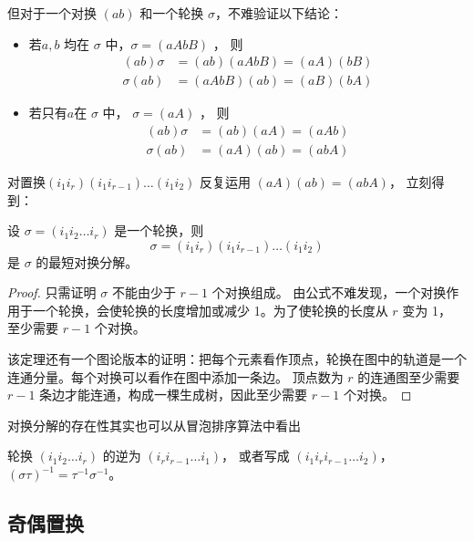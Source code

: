 但对于一个对换 \((ab)\) 和一个轮换 \(\sigma\)，不难验证以下结论：
\begin{itemize}
    \item 若\(a,b\) 均在 \(\sigma\) 中，\(\sigma = (aAbB)\) ，
        则
        \begin{align*}
            (ab)\sigma &= (ab)(aAbB) = (aA)(bB)\\
            \sigma(ab) &= (aAbB)(ab) = (aB)(bA)
        \end{align*}
    \item 若只有\(a\)在 \(\sigma\) 中， \(\sigma = (aA)\) ，
        则
        \begin{align*}
            (ab)\sigma &= (ab)(aA) = (aAb)\\
            \sigma(ab) &= (aA)(ab) = (abA)
        \end{align*}
\end{itemize}
对置换\((i_{1}i_{r})(i_{1}i_{r-1})\dots (i_{1}i_{2})\) 反复运用 \((aA)(ab)=(abA)\)，
立刻得到：
\begin{theorem}[轮换的最短对换分解]
    设 \(\sigma = (i_{1}i_{2}\dots i_{r})\) 是一个轮换，则
    \[
        \sigma = (i_{1}i_{r})(i_{1}i_{r-1})\dots(i_{1}i_{2})
    \]
    是 \(\sigma\) 的最短对换分解。
\end{theorem}
\begin{proof}
    只需证明 \(\sigma\) 不能由少于 \(r-1\) 个对换组成。
    由公式不难发现，一个对换作用于一个轮换，会使轮换的长度增加或减少 1。为了使轮换的长度从 \(r\) 变为 1，
    至少需要 \(r-1\) 个对换。

    该定理还有一个图论版本的证明：把每个元素看作顶点，轮换在图中的轨道是一个连通分量。每个对换可以看作在图中添加一条边。
    顶点数为 \(r\) 的连通图至少需要 \(r-1\) 条边才能连通，构成一棵生成树，因此至少需要 \(r-1\) 个对换。
\end{proof}

对换分解的存在性其实也可以从冒泡排序算法中看出

轮换 \((i_{1}i_{2}\dots i_{r})\) 的逆为 \((i_{r}i_{r-1}\dots i_{1})\)，
或者写成 \((i_{1}i_{r}i_{r-1}\dots i_{2})\)，
\((\sigma\tau)^{-1} = \tau^{-1}\sigma^{-1}\)。

\subsection{奇偶置换}

